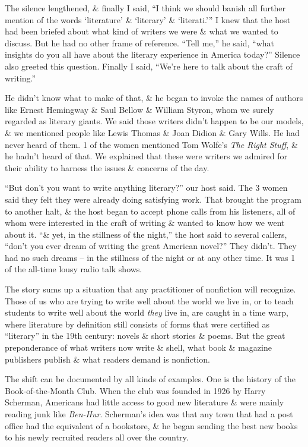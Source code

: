 \documentclass{article}
\begin{document}
The silence lengthened, \& finally I said, ``I think we should banish all further mention of the words `literature' \& `literary' \& `literati.''' I knew that the host had been briefed about what kind of writers we were \& what we wanted to discuss. But he had no other frame of reference. ``Tell me,'' he said, ``what insights do you all have about the literary experience in America today?'' Silence also greeted this question. Finally I said, ``We're here to talk about the craft of writing.''

He didn't know what to make of that, \& he began to invoke the names of authors like Ernest Hemingway \& Saul Bellow \& William Styron, whom we surely regarded as literary giants. We said those writers didn't happen to be our models, \& we mentioned people like Lewis Thomas \& Joan Didion \& Gary Wills. He had never heard of them. 1 of the women mentioned Tom Wolfe's \textit{The Right Stuff}, \& he hadn't heard of that. We explained that these were writers we admired for their ability to harness the issues \& concerns of the day.

``But don't you want to write anything literary?'' our host said. The 3 women said they felt they were already doing satisfying work. That brought the program to another halt, \& the host began to accept phone calls from his listeners, all of whom were interested in the craft of writing \& wanted to know how we went about it. ``\& yet, in the stillness of the night,'' the host said to several callers, ``don't you ever dream of writing the great American novel?'' They didn't. They had no such dreams -- in the stillness of the night or at any other time. It was 1 of the all-time lousy radio talk shows.

The story sums up a situation that any practitioner of nonfiction will recognize. Those of us who are trying to write well about the world we live in, or to teach students to write well about the world \textit{they} live in, are caught in a time warp, where literature by definition still consists of forms that were certified as ``literary'' in the 19th century: novels \& short stories \& poems. But the great preponderance of what writers now write \& shell, what book \& magazine publishers publish \& what readers demand is nonfiction.

The shift can be documented by all kinds of examples. One is the history of the Book-of-the-Month Club. When the club was founded in 1926 by Harry Scherman, Americans had little access to good new literature \& were mainly reading junk like \textit{Ben-Hur}. Scherman's idea was that any town that had a post office had the equivalent of a bookstore, \& he began sending the best new books to his newly recruited readers all over the country.
\end{document}
